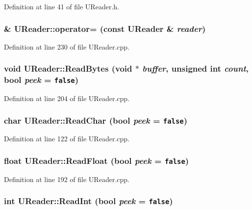 Definition at line 41 of file UReader.h.\hypertarget{class_u_reader_cf1394f05759fba94b4f1abb6f481376}{
\subsubsection[{operator=}]{ \& UReader::operator= (const {\bf UReader} \& {\em reader})}}
\label{class_u_reader_cf1394f05759fba94b4f1abb6f481376}




Definition at line 230 of file UReader.cpp.\hypertarget{class_u_reader_bd5d03b7bca4540f0cdcfb4226f002ee}{
\subsubsection[{ReadBytes}]{\setlength{\rightskip}{0pt plus 5cm}void UReader::ReadBytes (void $\ast$ {\em buffer}, \/  unsigned int {\em count}, \/  bool {\em peek} = {\tt false})}}
\label{class_u_reader_bd5d03b7bca4540f0cdcfb4226f002ee}




Definition at line 204 of file UReader.cpp.\hypertarget{class_u_reader_be9fed099ce8cff9e51f52f98a862db1}{
\subsubsection[{ReadChar}]{\setlength{\rightskip}{0pt plus 5cm}char UReader::ReadChar (bool {\em peek} = {\tt false})}}
\label{class_u_reader_be9fed099ce8cff9e51f52f98a862db1}




Definition at line 122 of file UReader.cpp.\hypertarget{class_u_reader_4f6bada39ee0d8bb0378ff7aca8a842e}{
\subsubsection[{ReadFloat}]{\setlength{\rightskip}{0pt plus 5cm}float UReader::ReadFloat (bool {\em peek} = {\tt false})}}
\label{class_u_reader_4f6bada39ee0d8bb0378ff7aca8a842e}




Definition at line 192 of file UReader.cpp.\hypertarget{class_u_reader_e30a8a2deaba30f2dc209781ea1bc16b}{
\subsubsection[{ReadInt}]{\setlength{\rightskip}{0pt plus 5cm}int UReader::ReadInt (bool {\em peek} = {\tt false})}}
\label{class_u_reader_e30a8a2deaba30f2dc209781ea1bc16b}




